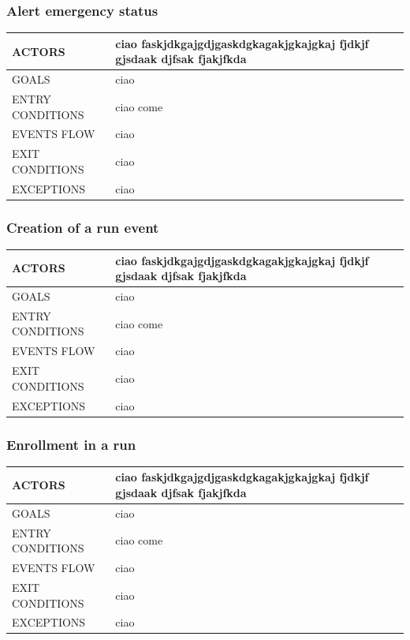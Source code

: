 \documentclass[a4paper]{article}
\begin{document}
\vspace{1cm}

\subsubsection{Alert emergency status}
\begin{center}
    \begin{tabular}{l || p{6cm} ||}
        ACTORS & ciao faskjdkgajgdjgaskdgkagakjgkajgkaj fjdkjf gjsdaak djfsak fjakjfkda \\ \hline
        GOALS & ciao \\ \hline
        ENTRY CONDITIONS & ciao come  \\ \hline
        EVENTS FLOW & ciao\\ \hline
        EXIT CONDITIONS & ciao\\ \hline
        EXCEPTIONS & ciao\\ \hline \hline
    \end{tabular}
\end{center}

\vspace{1cm}

\subsubsection{Creation of a run event}
\begin{center}
    \begin{tabular}{l || p{6cm} ||}
        ACTORS & ciao faskjdkgajgdjgaskdgkagakjgkajgkaj fjdkjf gjsdaak djfsak fjakjfkda \\ \hline
        GOALS & ciao \\ \hline
        ENTRY CONDITIONS & ciao come  \\ \hline
        EVENTS FLOW & ciao\\ \hline
        EXIT CONDITIONS & ciao\\ \hline
        EXCEPTIONS & ciao\\ \hline \hline
    \end{tabular}
\end{center}

\vspace{1cm}

\subsubsection{Enrollment in a run}
\begin{center}
    \begin{tabular}{l || p{6cm} ||}
        ACTORS & ciao faskjdkgajgdjgaskdgkagakjgkajgkaj fjdkjf gjsdaak djfsak fjakjfkda \\ \hline
        GOALS & ciao \\ \hline
        ENTRY CONDITIONS & ciao come  \\ \hline
        EVENTS FLOW & ciao\\ \hline
        EXIT CONDITIONS & ciao\\ \hline
        EXCEPTIONS & ciao\\ \hline \hline
    \end{tabular}
\end{center}
\end{document}
